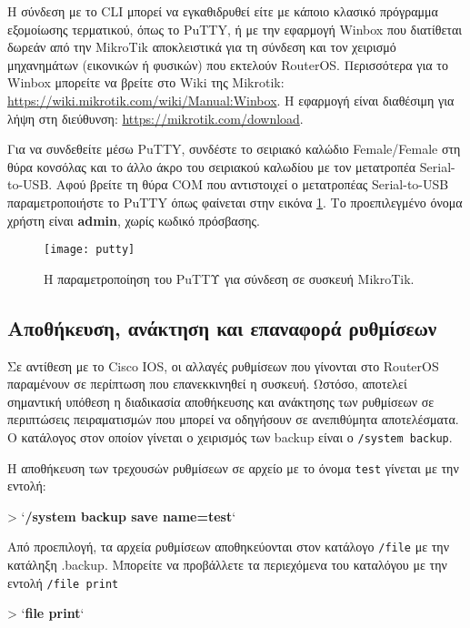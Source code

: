 \documentclass{EdipyLabs} %
\begin{document}
Η σύνδεση με το CLI μπορεί να εγκαθιδρυθεί είτε με κάποιο κλασικό πρόγραμμα εξομοίωσης τερματικού, όπως το PuTTY, ή με την εφαρμογή Winbox που διατίθεται δωρεάν από την MikroTik αποκλειστικά για τη σύνδεση και τον χειρισμό μηχανημάτων (εικονικών ή φυσικών) που εκτελούν RouterOS. Περισσότερα για το Winbox μπορείτε να βρείτε στο Wiki της Mikrotik: \url{https://wiki.mikrotik.com/wiki/Manual:Winbox}. H εφαρμογή είναι διαθέσιμη για λήψη στη διεύθυνση: \url{https://mikrotik.com/download}.

Για να συνδεθείτε μέσω PuTTY, συνδέστε το σειριακό καλώδιο Female/Female στη θύρα κονσόλας και το άλλο άκρο του σειριακού καλωδίου με τον μετατροπέα Serial-to-USB. Αφού βρείτε τη θύρα COM που αντιστοιχεί ο μετατροπέας Serial-to-USB παραμετροποιήστε το PuTTY όπως φαίνεται στην εικόνα \ref{fig:putty}. Το προεπιλεγμένο όνομα χρήστη είναι \textbf{admin}, χωρίς κωδικό πρόσβασης.

\begin{figure}[H]
	\centering
	\texttt{[image: putty]}
	\caption{Η παραμετροποίηση του PuΤΤΥ για σύνδεση σε συσκευή MikroTik.}\label{fig:putty}
\end{figure}

\subsection{Αποθήκευση, ανάκτηση και επαναφορά ρυθμίσεων}
Σε αντίθεση με το Cisco IOS, οι αλλαγές ρυθμίσεων που γίνονται στο RouterOS παραμένουν σε περίπτωση που επανεκκινηθεί η συσκευή. Ωστόσο, αποτελεί σημαντική υπόθεση η διαδικασία αποθήκευσης και ανάκτησης των ρυθμίσεων σε περιπτώσεις πειραματισμών που μπορεί να οδηγήσουν σε ανεπιθύμητα αποτελέσματα. Ο κατάλογος στον οποίον γίνεται ο χειρισμός των backup είναι ο \texttt{/system backup}.

Η αποθήκευση των τρεχουσών ρυθμίσεων σε αρχείο με το όνομα \texttt{test} γίνεται με την εντολή:

\begin{CommandBox}
 > `\textbf{/system backup save name=test}`
\end{CommandBox}

Από προεπιλογή, τα αρχεία ρυθμίσεων αποθηκεύονται στον κατάλογο \texttt{/file} με την κατάληξη .backup. Μπορείτε να προβάλλετε τα περιεχόμενα του καταλόγου με την εντολή \texttt{/file print}

\begin{CommandBox}
 > `\textbf{file print}`
\end{CommandBox}
\end{document}
